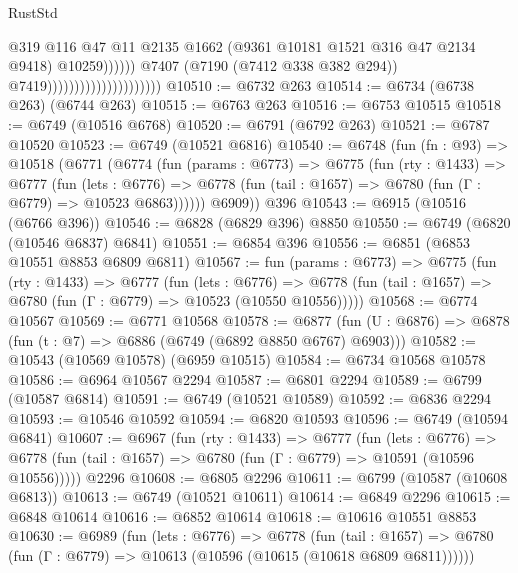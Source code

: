\begin{lexlean}{RustStd}
\begin{coremodule}
                                                          @319
                                                          @116
                                                          @47
                                                          @11
                                                          @2135
                                                          @1662
                                                          (@9361 @10181 @1521 @316 @47 @2134 @9418)
                                                          @10259))))))
                                              @7407
                                              (@7190 (@7412 @338 @382 @294))
                                              @7419)))))))))))))))))))))
@10510 := @6732 @263
@10514 := @6734 (@6738 @263) (@6744 @263)
@10515 := @6763 @263
@10516 := @6753 @10515
@10518 := @6749 (@10516 @6768)
@10520 := @6791 (@6792 @263)
@10521 := @6787 @10520
@10523 := @6749 (@10521 @6816)
@10540 := @6748
    (fun (fn : @93) =>
    @10518
      (@6771
        (@6774
          (fun (params : @6773) =>
          @6775
            (fun (rty : @1433) =>
            @6777
              (fun (lets : @6776) =>
              @6778 (fun (tail : @1657) => @6780 (fun (Γ : @6779) => @10523 @6863))))))
        @6909))
    @396
@10543 := @6915 (@10516 (@6766 @396))
@10546 := @6828 (@6829 @396) @8850
@10550 := @6749 (@6820 (@10546 @6837) @6841)
@10551 := @6854 @396
@10556 := @6851 (@6853 @10551 @8853 @6809 @6811)
@10567 := fun (params : @6773) =>
  @6775
    (fun (rty : @1433) =>
    @6777
      (fun (lets : @6776) =>
      @6778 (fun (tail : @1657) => @6780 (fun (Γ : @6779) => @10523 (@10550 @10556)))))
@10568 := @6774 @10567
@10569 := @6771 @10568
@10578 := @6877 (fun (U : @6876) => @6878 (fun (t : @7) => @6886 (@6749 (@6892 @8850 @6767) @6903)))
@10582 := @10543 (@10569 @10578) (@6959 @10515)
@10584 := @6734 @10568 @10578
@10586 := @6964 @10567 @2294
@10587 := @6801 @2294
@10589 := @6799 (@10587 @6814)
@10591 := @6749 (@10521 @10589)
@10592 := @6836 @2294
@10593 := @10546 @10592
@10594 := @6820 @10593
@10596 := @6749 (@10594 @6841)
@10607 := @6967
    (fun (rty : @1433) =>
    @6777
      (fun (lets : @6776) =>
      @6778 (fun (tail : @1657) => @6780 (fun (Γ : @6779) => @10591 (@10596 @10556)))))
    @2296
@10608 := @6805 @2296
@10611 := @6799 (@10587 (@10608 @6813))
@10613 := @6749 (@10521 @10611)
@10614 := @6849 @2296
@10615 := @6848 @10614
@10616 := @6852 @10614
@10618 := @10616 @10551 @8853
@10630 := @6989
    (fun (lets : @6776) =>
    @6778
      (fun (tail : @1657) =>
      @6780 (fun (Γ : @6779) => @10613 (@10596 (@10615 (@10618 @6809 @6811))))))

\end{coremodule}
\end{lexlean}
